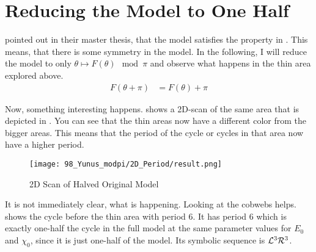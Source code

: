 \section{Reducing the Model to One Half}

 pointed out in their master thesis, that the model satisfies the property in .
This means, that there is some symmetry in the model.
In the following, I will reduce the model to only $\theta \mapsto F(\theta) \mod \pi$ and observe what happens in the thin area explored above.
\begin{align}
    F(\theta + \pi) & = F(\theta) + \pi \label{equ:yunus.property.symmetry}
\end{align}

Now, something interesting happens.
 shows a 2D-scan of the same area that is depicted in .
You can see that the thin areas now have a different color from the bigger areas.
This means that the period of the cycle or cycles in that area now have a higher period.

\begin{figure}
    \centering
    \texttt{[image: 98\_Yunus\_modpi/2D\_Period/result.png]}
    \caption{2D Scan of Halved Original Model}
    \label{fig:yunus.pi.2d.full}
\end{figure}

It is not immediately clear, what is happening.
Looking at the cobwebs helps.
 shows the cycle before the thin area with period 6.
It has period 6 which is exactly one-half the cycle in the full model at the same parameter values for $E_0$ and $\chi_0$, since it is just one-half of the model.
Its symbolic sequence is $\mathcal{L}^3\mathcal{R}^3$.

